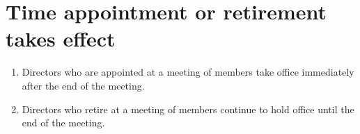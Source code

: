 \section{Time appointment or retirement takes effect}

\begin{enumerate}[label=(\alph*)]
    \item Directors who are appointed at a meeting of members take office immediately after the end of the meeting.
    
    \item Directors who retire at a meeting of members continue to hold office until the end of the meeting.
\end{enumerate} 